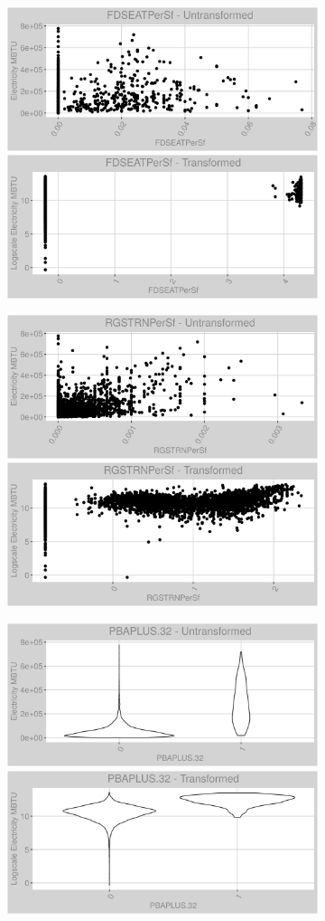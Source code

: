 \FloatBarrier
\newpage
\begin{figure}
\centering
\begin{subfigure}{1\textwidth}
\centering
\includegraphics[width=.49\textwidth, height=0.3\textheight]{Images/electricity_psf_var_original_3.png}
\includegraphics[width=.49\textwidth, height=0.3\textheight]{Images/electricity_psf_var_transformed_3.png}
\end{subfigure}
\begin{subfigure}{1\textwidth}
\centering
\includegraphics[width=.49\textwidth, height=0.3\textheight]{Images/electricity_psf_var_original_4.png}
\includegraphics[width=.49\textwidth, height=0.3\textheight]{Images/electricity_psf_var_transformed_4.png}
\end{subfigure}
\begin{subfigure}{1\textwidth}
\centering
\includegraphics[width=.49\textwidth, height=0.3\textheight]{Images/electricity_psf_var_original_5.png}
\includegraphics[width=.49\textwidth, height=0.3\textheight]{Images/electricity_psf_var_transformed_5.png}
\end{subfigure}
\end{figure}
